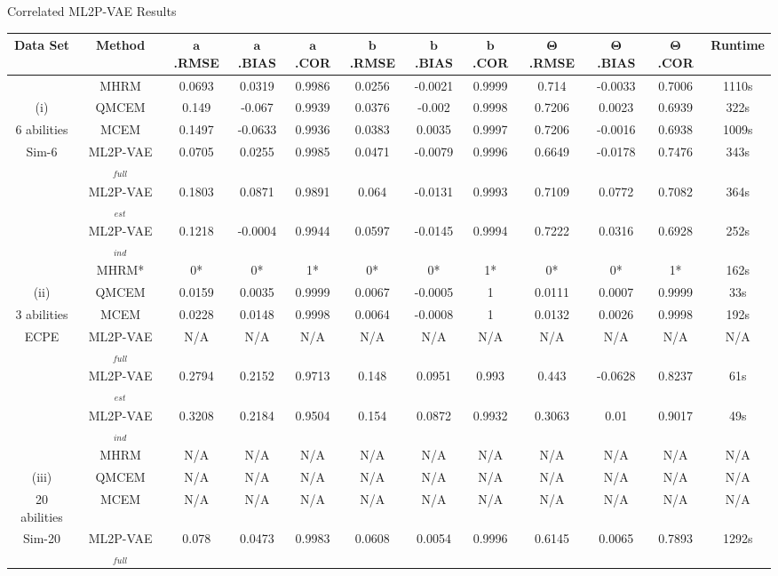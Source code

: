 \documentclass{beamer}
\newcommand{\vect}[1]{\boldsymbol{#1}}
\theoremstyle{definition}
\begin{document}
\begin{frame}{Correlated ML2P-VAE Results}
  \tiny
\begin{tabular}{c|c|ccc|ccc|ccc|c}
  \hline
    Data Set & Method & $\vect a$.RMSE & $\vect a$.BIAS & $\vect a$.COR & $\vect b$.RMSE & $\vect b$.BIAS & $\vect b$.COR &  $\vect \Theta$.RMSE & $\vect \Theta$.BIAS & $\vect \Theta$.COR & Runtime \\
    \hline
& MHRM & 0.0693 & 0.0319  & 0.9986   & 0.0256 & -0.0021 & 0.9999  & 0.714  & -0.0033  & 0.7006 & 1110s \\ 
(i)& QMCEM & 0.149 & -0.067 & 0.9939 & 0.0376 & -0.002 & 0.9998 & 0.7206 & 0.0023 & 0.6939 & 322s\\
6 abilities& MCEM & 0.1497 & -0.0633 &  0.9936 &  0.0383 & 0.0035 & 0.9997 &  0.7206 & -0.0016 & 0.6938 & 1009s\\
Sim-6& ML2P-VAE$_{full}$ & 0.0705 &  0.0255  & 0.9985   & 0.0471 & -0.0079 & 0.9996  & 0.6649   & -0.0178  & 0.7476 & 343s\\
& ML2P-VAE$_{est}$ & 0.1803 & 0.0871  & 0.9891 &  0.064 & -0.0131 & 0.9993  & 0.7109 &  0.0772  & 0.7082 & 364s \\
& ML2P-VAE$_{ind}$ & 0.1218 & -0.0004 & 0.9944   & 0.0597 & -0.0145 & 0.9994  & 0.7222 &  0.0316  & 0.6928 & 252s\\
\hline 
& MHRM* & 0* & 0*&  1* &  0* &  0* &  1* & 0* & 0* &  1* & 162s \\
(ii)& QMCEM & 0.0159  & 0.0035 & 0.9999 & 0.0067  & -0.0005 & 1   & 0.0111 & 0.0007 & 0.9999 & 33s\\
3 abilities & MCEM & 0.0228 & 0.0148 & 0.9998 & 0.0064  & -0.0008 & 1   & 0.0132 & 0.0026 & 0.9998 & 192s \\
ECPE & ML2P-VAE$_{full}$ & N/A & N/A & N/A & N/A & N/A & N/A & N/A & N/A & N/A & N/A  \\
& ML2P-VAE$_{est}$ & 0.2794 & 0.2152 & 0.9713 & 0.148 & 0.0951  & 0.993 & 0.443 & -0.0628 & 0.8237 & 61s  \\
& ML2P-VAE$_{ind}$ & 0.3208 & 0.2184 & 0.9504 & 0.154 & 0.0872  & 0.9932  & 0.3063 & 0.01 & 0.9017 & 49s \\
\hline
& MHRM & N/A & N/A & N/A & N/A & N/A & N/A & N/A & N/A & N/A & N/A  \\
(iii)& QMCEM & N/A & N/A & N/A & N/A & N/A & N/A & N/A & N/A & N/A & N/A \\
20 abilities & MCEM & N/A & N/A & N/A & N/A & N/A & N/A & N/A & N/A & N/A & N/A  \\
Sim-20 & ML2P-VAE$_{full}$ & 0.078 &  0.0473  & 0.9983  & 0.0608 &  0.0054  & 0.9996  & 0.6145 &  0.0065  & 0.7893 & 1292s \\

\end{tabular}
\end{frame}
\end{document}
